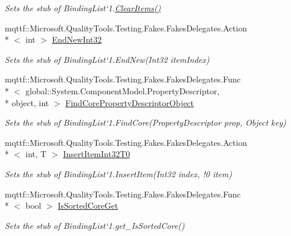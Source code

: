 \begin{DoxyCompactItemize}
\begin{DoxyCompactList}\small\item\em Sets the stub of Binding\-List`1.\hyperlink{class_system_1_1_component_model_1_1_fakes_1_1_stub_binding_list_3_01_t_01_4_a6f750bc8a776998c6d22dbd7398e301f}{Clear\-Items()}\end{DoxyCompactList}\item 
mqttf\-::\-Microsoft.\-Quality\-Tools.\-Testing.\-Fakes.\-Fakes\-Delegates.\-Action\\*
$<$ int $>$ \hyperlink{class_system_1_1_component_model_1_1_fakes_1_1_stub_binding_list_3_01_t_01_4_a1f00936569130f6c5083131d467935c2}{End\-New\-Int32}
\begin{DoxyCompactList}\small\item\em Sets the stub of Binding\-List`1.End\-New(\-Int32 item\-Index)\end{DoxyCompactList}\item 
mqttf\-::\-Microsoft.\-Quality\-Tools.\-Testing.\-Fakes.\-Fakes\-Delegates.\-Func\\*
$<$ global\-::\-System.\-Component\-Model.\-Property\-Descriptor, \\*
object, int $>$ \hyperlink{class_system_1_1_component_model_1_1_fakes_1_1_stub_binding_list_3_01_t_01_4_aebcbd4d277a372c5c492406f16eb4d35}{Find\-Core\-Property\-Descriptor\-Object}
\begin{DoxyCompactList}\small\item\em Sets the stub of Binding\-List`1.Find\-Core(\-Property\-Descriptor prop, Object key)\end{DoxyCompactList}\item 
mqttf\-::\-Microsoft.\-Quality\-Tools.\-Testing.\-Fakes.\-Fakes\-Delegates.\-Action\\*
$<$ int, T $>$ \hyperlink{class_system_1_1_component_model_1_1_fakes_1_1_stub_binding_list_3_01_t_01_4_a9953da842fe2ddd4cfcf865aff473f1a}{Insert\-Item\-Int32\-T0}
\begin{DoxyCompactList}\small\item\em Sets the stub of Binding\-List`1.Insert\-Item(Int32 index, !0 item)\end{DoxyCompactList}\item 
mqttf\-::\-Microsoft.\-Quality\-Tools.\-Testing.\-Fakes.\-Fakes\-Delegates.\-Func\\*
$<$ bool $>$ \hyperlink{class_system_1_1_component_model_1_1_fakes_1_1_stub_binding_list_3_01_t_01_4_a7877294c26fbf60afbb4c4ac08f13dab}{Is\-Sorted\-Core\-Get}
\begin{DoxyCompactList}\small\item\em Sets the stub of Binding\-List`1.get\-\_\-\-Is\-Sorted\-Core()\end{DoxyCompactList}\item 

\end{DoxyCompactItemize}

